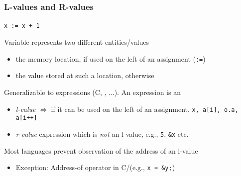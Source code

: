 \documentclass{beamer}
\newcommand{\Blue}[1]{\color{blue}#1\color{black}}
\begin{document}
\begin{frame}[fragile]
\frametitle{L-values and R-values}
\framesubtitle{}

\begin{center}
\texttt{\Blue{x}\ :=\ \color{red}x\color{black}\ + 1}
\end{center}

\pause\medskip

Variable represents two different entities/values 
\begin{itemize} 
\item the \Blue{memory location}, if used on the left of an assignment (\texttt{:=})
\item the \color{red}value stored at such a location\color{black}, otherwise
\end{itemize}

\pause\medskip


Generalizable to expressions (C, \cpp, ...). An expression is an
\begin{itemize}
\item \emph{l-value} $\Leftrightarrow$ if it can be used on the left of an assignment,
\texttt{x, a[i], o.a, a[i++]}
\item \emph{r-value} expression which is \emph{not} an l-value, e.g.,
  \texttt{5}, \texttt{\&x} etc.
\end{itemize}

\pause\medskip
Most languages prevent observation of the address of an l-value
\begin{itemize}
\item Exception: Address-of operator in C/\cpp (e.g., \texttt{x = \&y;})
\end{itemize}


\end{frame}
\end{document}
